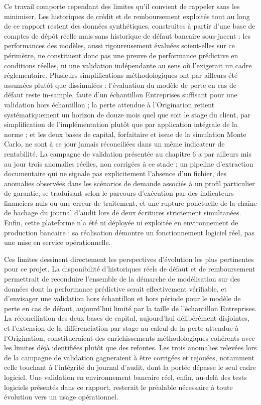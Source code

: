 Ce travail comporte cependant des limites qu'il convient de rappeler sans les minimiser. Les historiques de crédit et de remboursement exploités tout au long de ce rapport restent des données synthétiques, construites à partir d'une base de comptes de dépôt réelle mais sans historique de défaut bancaire sous-jacent : les performances des modèles, aussi rigoureusement évaluées soient-elles sur ce périmètre, ne constituent donc pas une preuve de performance prédictive en conditions réelles, ni une validation indépendante au sens où l'exigerait un cadre réglementaire. Plusieurs simplifications méthodologiques ont par ailleurs été assumées plutôt que dissimulées : l'évaluation du modèle de perte en cas de défaut reste in-sample, faute d'un échantillon Entreprises suffisant pour une validation hors échantillon ; la perte attendue à l'Origination retient systématiquement un horizon de douze mois quel que soit le stage du client, par simplification de l'implémentation plutôt que par application intégrale de la norme ; et les deux bases de capital, forfaitaire et issue de la simulation Monte Carlo, ne sont à ce jour jamais réconciliées dans un même indicateur de rentabilité. La campagne de validation présentée au chapitre 6 a par ailleurs mis au jour trois anomalies réelles, non corrigées à ce stade : un pipeline d'extraction documentaire qui ne signale pas explicitement l'absence d'un fichier, des anomalies observées dans les scénarios de demande associés à un profil particulier de garantie, se traduisant selon le parcours d'exécution par des indicateurs financiers nuls ou une erreur de traitement, et une rupture ponctuelle de la chaîne de hachage du journal d'audit lors de deux écritures strictement simultanées. Enfin, cette plateforme n'a été ni déployée ni exploitée en environnement de production bancaire : sa réalisation démontre un fonctionnement logiciel réel, pas une mise en service opérationnelle.

Ces limites dessinent directement les perspectives d'évolution les plus pertinentes pour ce projet. La disponibilité d'historiques réels de défaut et de remboursement permettrait de reconduire l'ensemble de la démarche de modélisation sur des données dont la performance prédictive serait effectivement vérifiable, et d'envisager une validation hors échantillon et hors période pour le modèle de perte en cas de défaut, aujourd'hui limité par la taille de l'échantillon Entreprises. La réconciliation des deux bases de capital, aujourd'hui délibérément disjointes, et l'extension de la différenciation par stage au calcul de la perte attendue à l'Origination, constitueraient des enrichissements méthodologiques cohérents avec les limites déjà identifiées plutôt que des refontes. Les trois anomalies relevées lors de la campagne de validation gagneraient à être corrigées et rejouées, notamment celle touchant à l'intégrité du journal d'audit, dont la portée dépasse le seul cadre logiciel. Une validation en environnement bancaire réel, enfin, au-delà des tests logiciels présentés dans ce rapport, resterait le préalable nécessaire à toute évolution vers un usage opérationnel.

